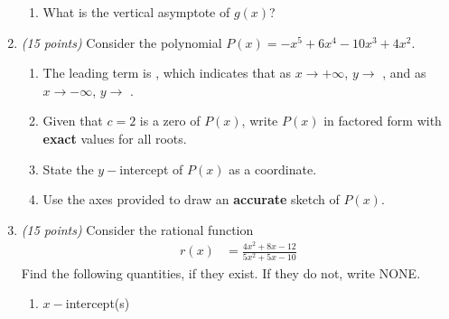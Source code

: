 \documentclass[fleqn]{article}
\renewcommand{\thispagestyle}[1]{}
\begin{document}
\begin{enumerate}
\begin{enumerate}
\item What is the vertical asymptote of $g(x)$?

\vspace{1in}

\end{enumerate}

\pagebreak
\thispagestyle{fancy}{
\lhead{}
}

\item \textit{(15 points)} Consider the polynomial $P(x) = -x^5 + 6x^4 - 10x^3 + 4x^2$.
\begin{enumerate}
\item
The leading term is \underline{\hspace{1in}}, which indicates that as $x \to +\infty$, $y \to $ \underline{\hspace{1in}}, and as $x \to -\infty$, $y \to $ \underline{\hspace{1in}}.

\item Given that $c = 2$ is a zero of $P(x)$, write $P(x)$ in factored form with \textbf{exact} values for all roots. 

\vspace{3.25in}

\item State the $y-$intercept of $P(x)$ as a coordinate.

\vspace{0.5in}

\item Use the axes provided to draw an \textbf{accurate} sketch of $P(x)$.


\end{enumerate}

\pagebreak
\thispagestyle{fancy}{
\lhead{}
}

\item 
\textit{(15 points)} Consider the rational function 
\begin{align*}
r(x) &= \frac{ 4x^2+8x-12 }{ 5x^2+5x-10 }
\end{align*}
Find the following quantities, if they exist. 
If they do not, write NONE.
\begin{enumerate}
\item $x-$intercept(s)


\end{enumerate}
\end{enumerate}
\end{document}

